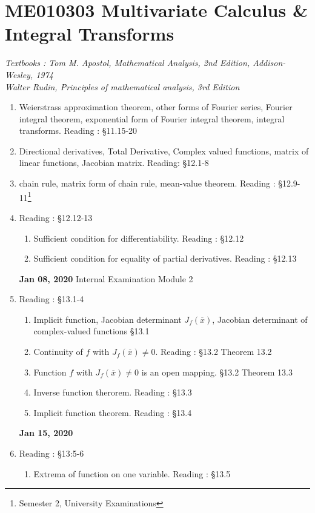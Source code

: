 \chapter[multivariate calculus]{ME010303 Multivariate Calculus \& Integral Transforms}
\textit{Textbooks : Tom M. Apostol, Mathematical Analysis, 2nd Edition, Addison-Wesley, 1974\\Walter Rudin, Principles of mathematical analysis, 3rd Edition}
\begin{enumerate}[label=Week \arabic*]
	\item Weierstrass approximation theorem, other forms of Fourier series, Fourier integral theorem, exponential form of Fourier integral theorem, integral transforms. Reading : \S 11.15-20
	\item Directional derivatives, Total Derivative, Complex valued functions, matrix of linear functions, Jacobian matrix. Reading: \S 12.1-8
	\item chain rule, matrix form of chain rule, mean-value theorem. Reading : \S 12.9-11\footnote{Semester 2, University Examinations}
	\item Reading : \S12.12-13
		\begin{enumerate}[label=Day \arabic*]
			\item Sufficient condition for differentiability. Reading : \S12.12
			\item Sufficient condition for equality of partial derivatives. Reading : \S12.13
		\end{enumerate}
		\textbf{Jan 08, 2020} Internal Examination Module 2
	\item  Reading : \S13.1-4
		\begin{enumerate}[label=Day \arabic*]
			\item Implicit function, Jacobian determinant $J_f(\overline{x})$, Jacobian determinant of complex-valued functions \S13.1
			\item Continuity of $f$ with $J_f(\overline{x}) \ne 0$. Reading : \S13.2 Theorem 13.2
			\item Function $f$ with $J_f(\overline{x}) \ne 0$ is an open mapping. \S13.2 Theorem 13.3
			\item Inverse function therorem. Reading : \S13.3
			\item Implicit function theorem. Reading : \S13.4
		\end{enumerate}
		\textbf{Jan 15, 2020}
	\item  Reading : \S 13:5-6
		\begin{enumerate}[label=Day \arabic*]
			\item Extrema of function on one variable. Reading : \S13.5

\end{enumerate}
\end{enumerate}

